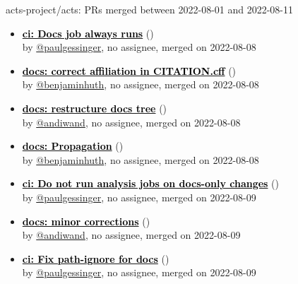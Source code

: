 \begin{frame}[allowframebreaks]{ acts-project/acts: PRs merged 
between 2022-08-01 and 2022-08-11
}
\begin{itemize}
    \item\prmerged\textbf{\href{https://github.com/acts-project/acts/pull/1391}{\textcolor{black}{ci: Docs job always runs}}}
    (\href{https://github.com/acts-project/acts/pull/1391}{}) \\
    by \href{https://github.com/paulgessinger}{@paulgessinger}, {}no assignee, merged on 2022-08-08

    \item\prmerged\textbf{\href{https://github.com/acts-project/acts/pull/1390}{\textcolor{black}{docs: correct affiliation in CITATION.cff}}}
    (\href{https://github.com/acts-project/acts/pull/1390}{}) \\
    by \href{https://github.com/benjaminhuth}{@benjaminhuth}, {}no assignee, merged on 2022-08-08

    \item\prmerged\prwip\textbf{\href{https://github.com/acts-project/acts/pull/1387}{\textcolor{black}{docs: restructure docs tree}}}
    (\href{https://github.com/acts-project/acts/pull/1387}{}) \\
    by \href{https://github.com/andiwand}{@andiwand}, {}no assignee, merged on 2022-08-08

    \item\prmerged\textbf{\href{https://github.com/acts-project/acts/pull/1396}{\textcolor{black}{docs: Propagation}}}
    (\href{https://github.com/acts-project/acts/pull/1396}{}) \\
    by \href{https://github.com/benjaminhuth}{@benjaminhuth}, {}no assignee, merged on 2022-08-08

    \item\prmerged\textbf{\href{https://github.com/acts-project/acts/pull/1400}{\textcolor{black}{ci: Do not run analysis jobs on docs-only changes}}}
    (\href{https://github.com/acts-project/acts/pull/1400}{}) \\
    by \href{https://github.com/paulgessinger}{@paulgessinger}, {}no assignee, merged on 2022-08-09

    \item\prmerged\textbf{\href{https://github.com/acts-project/acts/pull/1405}{\textcolor{black}{docs: minor corrections}}}
    (\href{https://github.com/acts-project/acts/pull/1405}{}) \\
    by \href{https://github.com/andiwand}{@andiwand}, {}no assignee, merged on 2022-08-09

    \item\prmerged\textbf{\href{https://github.com/acts-project/acts/pull/1408}{\textcolor{black}{ci: Fix path-ignore for docs}}}
    (\href{https://github.com/acts-project/acts/pull/1408}{}) \\
    by \href{https://github.com/paulgessinger}{@paulgessinger}, {}no assignee, merged on 2022-08-09


\end{itemize}
\end{frame}

